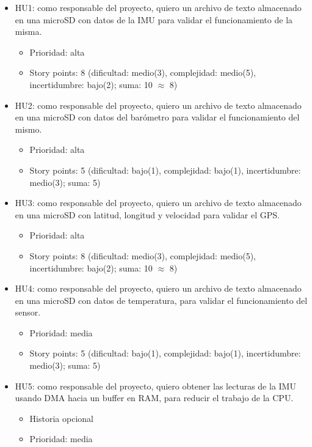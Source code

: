 \documentclass[
11pt, %
]{charter}
\begin{document}
\begin{itemize}
    \item HU1: como responsable del proyecto, quiero un archivo de texto almacenado en una microSD con datos de la IMU para validar el funcionamiento de la misma.
    \begin{itemize}
      \item Prioridad: alta
      \item Story points: 8 (dificultad: medio(3), complejidad: medio(5), incertidumbre: bajo(2); suma: 10 $\approx$ 8)
    \end{itemize}
    \item HU2: como responsable del proyecto, quiero un archivo de texto almacenado en una microSD con datos del barómetro para validar el funcionamiento del mismo.
    \begin{itemize}
      \item Prioridad: alta
      \item Story points: 5 (dificultad: bajo(1), complejidad: bajo(1), incertidumbre: medio(3); suma: 5)
    \end{itemize}
    \item HU3: como responsable del proyecto, quiero un archivo de texto almacenado en una microSD con latitud, longitud y velocidad para validar el GPS.
    \begin{itemize}
      \item Prioridad: alta
      \item Story points: 8 (dificultad: medio(3), complejidad: medio(5), incertidumbre: bajo(2); suma: 10 $\approx$ 8)
    \end{itemize}
    \item HU4: como responsable del proyecto, quiero un archivo de texto almacenado en una microSD con datos de temperatura, para validar el funcionamiento del sensor.
    \begin{itemize}
      \item Prioridad: media
      \item Story points: 5 (dificultad: bajo(1), complejidad: bajo(1), incertidumbre: medio(3); suma: 5)
    \end{itemize}
    \item HU5: como responsable del proyecto, quiero obtener las lecturas de la IMU usando DMA hacia un buffer en RAM, para reducir el trabajo de la CPU.
    \begin{itemize}
      \item Historia opcional
      \item Prioridad: media

\end{itemize}
\end{itemize}
\end{document}

